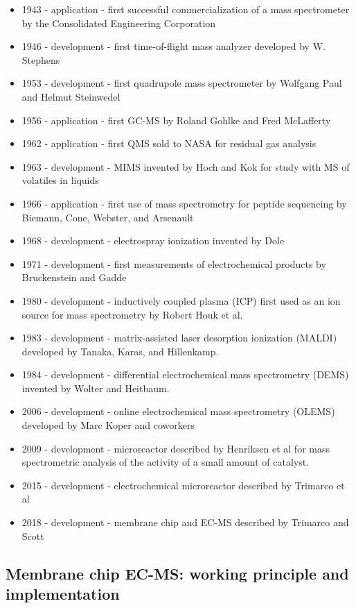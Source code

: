 \begin{itemize}
	\item 1943 - application - first successful commercialization of a mass spectrometer by the Consolidated Engineering Corporation
	\item 1946 - development - first time-of-flight mass analyzer developed by W. Stephens
	\item 1953 - development - first quadrupole mass spectrometer by Wolfgang Paul and Helmut Steinwedel
	\item 1956 - application - first GC-MS by Roland Gohlke and Fred McLafferty
	\item 1962 - application - first QMS sold to NASA for residual gas analysis
	\item 1963 - development - MIMS invented by Hoch and Kok for study with MS of volatiles in liquids
	\item 1966 - application - first use of mass spectrometry for peptide sequencing by Biemann, Cone, Webster, and Arsenault
	\item 1968 - development - electrospray ionization invented by Dole
	\item 1971 - development - first measurements of electrochemical products by Bruckenstein and Gadde
	\item 1980 - development - inductively coupled plasma (ICP) first used as an ion source for mass spectrometry by Robert Houk et al.
	\item 1983 - development - matrix-assisted laser desorption ionization (MALDI) developed by Tanaka, Karas, and Hillenkamp.
	\item 1984 - development - differential electrochemical mass spectrometry (DEMS) invented by Wolter and Heitbaum. 
	\item 2006 - development - online electrochemical mass spectrometry (OLEMS) developed by Marc Koper and coworkers
	\item 2009 - development - microreactor described by Henriksen et al for mass spectrometric analysis of the activity of a small amount of catalyst.
	\item 2015 - development - electrochemical microreactor described by Trimarco et al
	\item 2018 - development - membrane chip and EC-MS described by Trimarco and Scott
\end{itemize}


\subsection{Membrane chip EC-MS: working principle and implementation}
